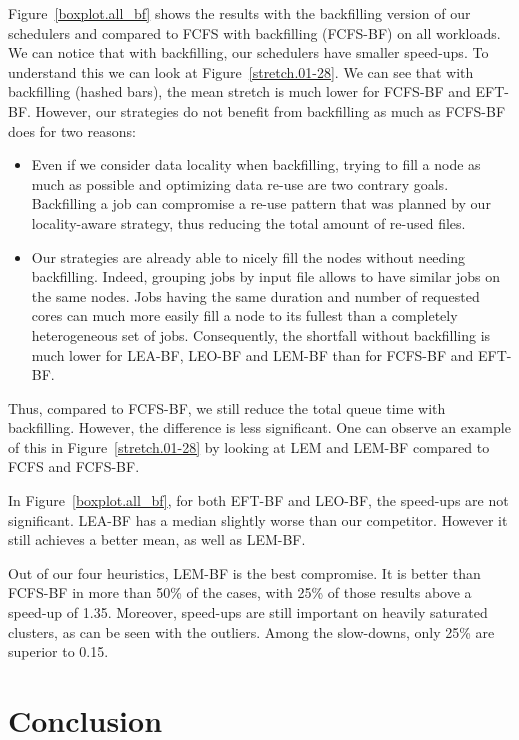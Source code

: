 \documentclass[conference,10pt]{IEEEtran}
\begin{document}
Figure~\ref{boxplot.all_bf} shows the results with the backfilling version of our
schedulers and compared to FCFS with backfilling (FCFS-BF) on all workloads.
We can notice that with backfilling, our schedulers have smaller speed-ups.
To understand this we can look at Figure~\ref{stretch.01-28}. We can see that 
with backfilling (hashed bars), the mean stretch is much lower for FCFS-BF and EFT-BF. 
However, our strategies do not benefit from backfilling as much as FCFS-BF does for two reasons:
\begin{itemize}
	\item Even if we consider data locality when backfilling, trying to fill a node as much as possible and optimizing data re-use are two contrary goals. 
	Backfilling a job can compromise a re-use pattern that was planned by our locality-aware strategy, thus reducing the total 
	amount of re-used files.
	\item Our strategies are already able to nicely fill the nodes without needing backfilling.
	Indeed, grouping jobs by input file allows to have similar jobs on the same nodes.
	Jobs having the same duration and number of requested cores can much more easily fill a node to its fullest than a completely heterogeneous set of jobs.
	Consequently, the shortfall without backfilling is much lower for LEA-BF, LEO-BF and LEM-BF than for FCFS-BF and EFT-BF.
\end{itemize}
Thus, compared to FCFS-BF, we still reduce the total queue time with backfilling.
However, the difference is less significant. One can observe an example of this
in Figure~\ref{stretch.01-28} by looking at LEM and LEM-BF compared to FCFS and FCFS-BF.

In Figure~\ref{boxplot.all_bf}, for both EFT-BF and LEO-BF, the speed-ups are not significant.
LEA-BF has a median slightly worse than our competitor. However it still
achieves a better mean, as well as LEM-BF.

Out of our four heuristics, LEM-BF is the best compromise.
It is better than FCFS-BF in more than 50\% of the cases, 
with 25\% of those results above a speed-up of 1.35.
Moreover, speed-ups are still important on heavily saturated clusters, as can be seen with the outliers.
Among the slow-downs, only 25\% are superior to 0.15.


\section{Conclusion}\label{sec.conclusion}




\end{document}
